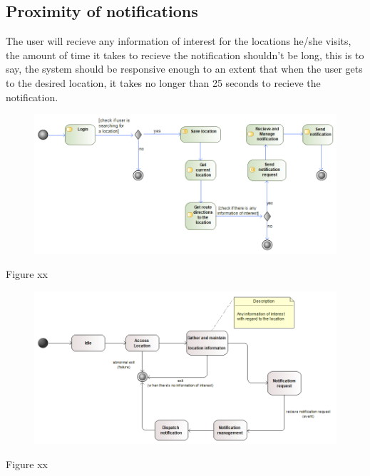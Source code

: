 \documentclass[a4paper, 12pt]{article}
\begin{document}
	\subsection{Proximity of notifications}
	The user will recieve any information of interest for the locations he/she visits, the amount
	of time it takes to recieve the notification shouldn't be long, this is to say, the system should 
	be responsive enough to an extent that when the user gets to the desired location, it takes no longer 
	than 25 seconds to recieve the notification.
  
	\begin{figure}[H]\includegraphics[width=\textwidth]{ActivityDiagram}\end{figure}
		\begin{center}Figure xx\end{center}
	\begin{figure}[H]\includegraphics[width=\textwidth]{StateDiagram}\end{figure}
		\begin{center}Figure xx\end{center}
\end{document}
